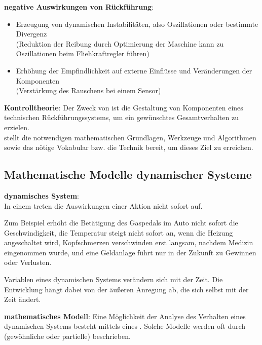 \textbf{negative Auswirkungen von Rückführung}:
\begin{itemize}
    \item
    Erzeugung von dynamischen Instabilitäten, also Oszillationen oder bestimmte Divergenz\\
    (Reduktion der Reibung durch Optimierung der Maschine kann zu Oszillationen beim
    Fliehkraftregler führen)
    
    \item
    Erhöhung der Empfindlichkeit auf externe Einflüsse und Veränderungen der Komponenten\\
    (Verstärkung des Rauschens bei einem Sensor)
\end{itemize}

\linie

\textbf{Kontrolltheorie}:
Der Zweck von  ist die Gestaltung von Komponenten eines
technischen Rückführungssystems, um ein gewünschtes Gesamtverhalten zu erzielen.\\
 stellt die notwendigen mathematischen Grundlagen,
Werkzeuge und Algorithmen sowie das nötige Vokabular bzw. die Technik bereit, um dieses Ziel zu
erreichen.

\pagebreak

\subsection{%
    Mathematische Modelle dynamischer Systeme%
}

\textbf{dynamisches System}:\\
In einem  treten die Auswirkungen einer Aktion nicht sofort auf.

Zum Beispiel erhöht die Betätigung des Gaspedals im Auto nicht sofort die Geschwindigkeit,
die Temperatur steigt nicht sofort an, wenn die Heizung angeschaltet wird,
Kopfschmerzen verschwinden erst langsam, nachdem Medizin eingenommen wurde, und
eine Geldanlage führt nur in der Zukunft zu Gewinnen oder Verlusten.

Variablen eines dynamischen Systems verändern sich mit der Zeit.
Die Entwicklung hängt dabei von der äußeren Anregung ab, die sich selbst mit der Zeit ändert.

\linie

\textbf{mathematisches Modell}:
Eine Möglichkeit der Analyse des Verhalten eines dynamischen Systems besteht mittels eines
.
Solche Modelle werden oft durch (gewöhnliche oder partielle)
 beschrieben.

